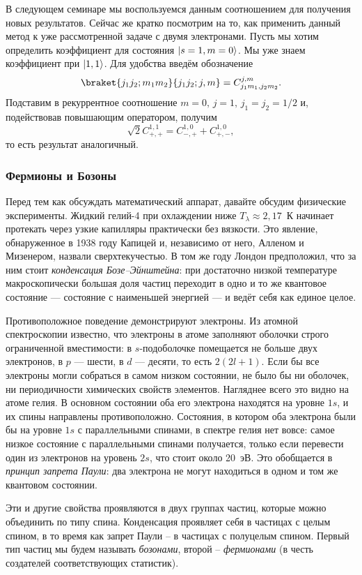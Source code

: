 В следующем семинаре мы воспользуемся данным соотношением для получения новых
результатов. Сейчас же кратко посмотрим на то, как применить данный метод к уже
рассмотренной задаче с двумя электронами. Пусть мы хотим определить коэффициент
для состояния $\lvert s=1, m=0\rangle$. Мы уже знаем коэффициент при $\lvert1, 1\rangle$. Для
удобства введём обозначение
\[
  \braket{j_1 j_2;m_1 m_2}{j_1 j_2; j, m} = C^{j,m}_{j_1m_1, j_2m_2}.
\]
Подставим в рекуррентное соотношение $m=0,\,j=1,\,j_1 = j_2 = 1/2$ и,
подействовав повышающим оператором, получим
\[
  \sqrt{2}C^{1,1}_{+, +} = C^{1,0}_{-, +} +  C^{1,0}_{+, -},
\]
то есть результат аналогичный.
\subsubsection{Фермионы и Бозоны}
Перед тем как обсуждать математический аппарат, давайте обсудим физические
эксперименты. Жидкий гелий-4 при охлаждении ниже $T_\lambda \approx 2{,}17$~К
начинает протекать через узкие капилляры практически без вязкости. Это явление,
обнаруженное в 1938 году Капицей и, независимо от него, Алленом и Мизенером,
назвали сверхтекучестью. В том же году Лондон предположил, что за ним стоит
\textit{конденсация Бозе--Эйнштейна}: при достаточно низкой температуре
макроскопически большая доля частиц переходит в одно и то же квантовое
состояние --- состояние с наименьшей энергией --- и ведёт себя как единое
целое.

Противоположное поведение демонстрируют электроны. Из атомной спектроскопии
известно, что электроны в атоме заполняют оболочки строго ограниченной
вместимости: в $s$-подоболочке помещается не больше двух электронов, в $p$ ---
шести, в $d$ --- десяти, то есть $2(2l+1)$. Если бы все электроны могли
собраться в самом низком состоянии, не было бы ни оболочек, ни периодичности
химических свойств элементов. Нагляднее всего это видно на атоме гелия. В
основном состоянии оба его электрона находятся на уровне $1s$, и их спины
направлены противоположно. Состояния, в котором оба электрона были бы на уровне
$1s$ с параллельными спинами, в спектре гелия нет вовсе: самое низкое состояние
с параллельными спинами получается, только если перевести один из электронов на
уровень $2s$, что стоит около 20~эВ. Это обобщается в \textit{принцип запрета
  Паули}: два электрона не могут находиться в одном и том же квантовом состоянии.

Эти и другие свойства проявляются в двух группах частиц, которые можно
объединить по типу спина. Конденсация проявляет себя в частицах с целым спином,
в то время как запрет Паули -- в частицах с полуцелым спином. Первый тип частиц
мы будем называть \textit{бозонами}, второй -- \textit{фермионами} (в честь
создателей соответствующих статистик).

